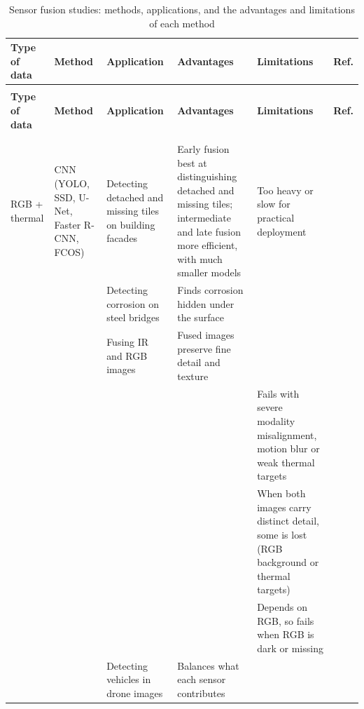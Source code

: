{\scriptsize
\renewcommand{\arraystretch}{1.15}
\setlength{\tabcolsep}{3pt}
\begin{xltabular}{\textwidth}{>{\RaggedRight\arraybackslash}p{1.6cm}>{\RaggedRight\arraybackslash}p{2.2cm}>{\RaggedRight\arraybackslash}p{2.3cm}>{\RaggedRight\arraybackslash}X>{\RaggedRight\arraybackslash}Xp{0.95cm}}
\caption{Sensor fusion studies: methods, applications, and the advantages and limitations of each method}\label{tab:fusion-method}\\
\toprule
\textbf{Type of data} & \textbf{Method} & \textbf{Application} & \textbf{Advantages} & \textbf{Limitations} & \textbf{Ref.} \\
\midrule
\endfirsthead
{}\\
\toprule
\textbf{Type of data} & \textbf{Method} & \textbf{Application} & \textbf{Advantages} & \textbf{Limitations} & \textbf{Ref.} \\
\midrule
\endhead
\midrule{}\\
\endfoot
\bottomrule
{}\\
\endlastfoot
RGB + thermal & CNN (YOLO, SSD, U-Net, Faster R-CNN, FCOS) & Detecting detached and missing tiles on building facades & Early fusion best at distinguishing detached and missing tiles; intermediate and late fusion more efficient, with much smaller models & Too heavy or slow for practical deployment & \citep{Yang2023} \\
 &  & Detecting corrosion on steel bridges & Finds corrosion hidden under the surface &  & \citep{Lim2021} \\
 &  & Fusing IR and RGB images & Fused images preserve fine detail and texture &  & \citep{Gao2026} \\
 &  &  &  & Fails with severe modality misalignment, motion blur or weak thermal targets & \citep{Zhu2026} \\
 &  &  &  & When both images carry distinct detail, some is lost (RGB background or thermal targets) & \citep{Lin2026} \\
 &  &  &  & Depends on RGB, so fails when RGB is dark or missing & \citep{Xiao2026} \\
 &  & Detecting vehicles in drone images & Balances what each sensor contributes &  & \citep{Tang2026} \\

\end{xltabular}}
